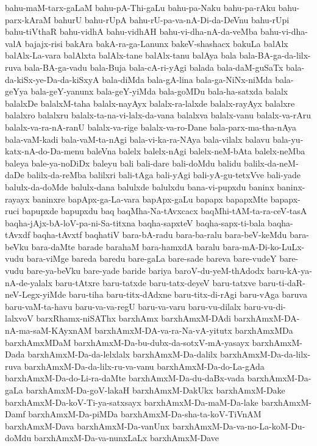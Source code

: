 {bahu-maM-tarx-gaLaM
bahu-pA-Thi-gaLu
bahu-pa-Naku
bahu-pa-rAku
bahu-parx-kAraM
bahurU
bahu-rUpA
bahu-rU-pa-va-nA-Di-da-DeVnu
bahu-rUpi
bahu-tiVthaR
bahu-vidhA
bahu-vidhAH
bahu-vi-dha-nA-da-veMba
bahu-vi-dha-valA
bajajx-risi
bakAra
bakA-ra-ga-Lanunx
bakeV-shashacx
bakuLa
balAlx
balAlx-La-vara
balAlxta
balAlx-tane
balAlx-tanu
balAya
bala
bala-BA-ga-da-lilx-ruva
bala-BA-ga-vadu
bala-Buja
bala-cA-ri-yAgi
balada
bala-daM-guSaTx
bala-da-kiSx-ye-Da-da-kiSxyA
bala-diMda
bala-gA-lina
bala-ga-NiNx-niMda
bala-geYya
bala-geY-yanunx
bala-geY-yiMda
bala-goMDu
bala-ha-satxda
balalx
balalxDe
balalxM-taha
balalx-nayAyx
balalx-ra-lalxde
balalx-rayAyx
balalxre
balalxro
balalxru
balalx-ta-na-vi-lalx-da-vana
balalxva
balalx-vanu
balalx-va-rAru
balalx-va-ra-nA-ranU
balalx-va-rige
balalx-va-ro-Dane
bala-parx-ma-tha-nAya
bala-vaM-kadi
bala-vaM-ta-nAgi
bala-vi-ka-ra-NAya
bala-vilalx
balavu
bala-yu-katx-nA-do-Da-menu
baleVna
balelx
balelx-nAgi
balelx-neM-bAta
balelx-neMba
baleya
bale-ya-noDiDx
baleyu
bali
bali-dare
bali-doMdu
balidu
balilx-da-neM-daDe
balilx-da-reMba
balilxri
bali-tAga
bali-yAgi
bali-yA-gu-tetxVve
bali-yade
balulx-da-doMde
balulx-dana
balulxde
balulxdu
bana-vi-pupxdu
baninx
baninx-rayayx
baninxre
bapApx-ga-La-vara
bapApx-gaLu
bapapx
bapapxMte
bapapx-ruci
bapupxde
bapupxdu
baq
baqMha-Na-tAvxcacx
baqMhi-tAM-ta-ra-ceV-tasA
baqha-jAjx-bA-loV-pa-ni-Sa-titxna
baqha-sapxteV
baqha-sapx-ti-bala
baqha-tAvxdf
baqha-tAvxtf
baqhatiV
bara-bA-radu
bara-ba-ralu
bara-beV-keMdu
bara-beVku
bara-daMte
barade
barahaM
bara-hamxdA
baralu
bara-mA-Di-ko-LuLx-vudu
bara-viMge
bareda
baredu
bare-gaLa
bare-sade
bareva
bare-vudeY
bare-vudu
bare-ya-beVku
bare-yade
baride
bariya
baroV-du-yeM-thAdodx
baru-kA-ya-nA-de-yalalx
baru-tAtxre
baru-tatxde
baru-tatx-deyeV
baru-tatxve
baru-ti-daR-neV-Legx-yiMde
baru-tiha
baru-titx-dAdxne
baru-titx-di-rAgi
baru-vAga
baruva
baru-vaM-ta-havu
baru-va-va-regU
baru-va-varu
baru-vu-dilalx
baru-vu-di-lalxvoV
barxRhamx-niSAThx
barxhAmx
barxhAmxM-DAdi
barxhAmxM-DA-nA-ma-saM-KAyxnAM
barxhAmxM-DA-va-ra-Na-vA-yitutx
barxhAmxMDa
barxhAmxMDaM
barxhAmxM-Da-bu-dubx-da-sotxV-mA-yasayx
barxhAmxM-Dada
barxhAmxM-Da-da-lelxlalx
barxhAmxM-Da-dalilx
barxhAmxM-Da-da-lilx-ruva
barxhAmxM-Da-da-lilx-ru-va-vanu
barxhAmxM-Da-do-La-gAda
barxhAmxM-Da-do-Li-ra-daMte
barxhAmxM-Da-du-daBx-vada
barxhAmxM-Da-gaLa
barxhAmxM-Da-goV-lakaH
barxhAmxM-DakUkx
barxhAmxM-Dake
barxhAmxM-Da-koV-Ti-ya-satxsayx
barxhAmxM-Da-maM-Da-lake
barxhAmxM-Damf
barxhAmxM-Da-piMDa
barxhAmxM-Da-sha-ta-koV-TiVnAM
barxhAmxM-Dava
barxhAmxM-Da-vanUnx
barxhAmxM-Da-va-no-La-koM-Du-doMdu
barxhAmxM-Da-va-nunxLaLx
barxhAmxM-Dave
}

